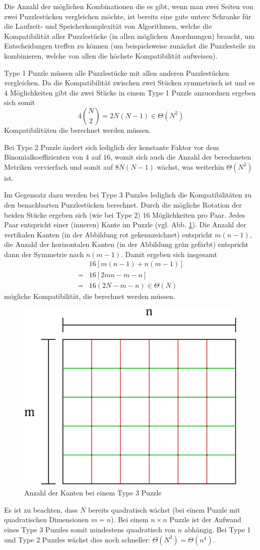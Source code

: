 \documentclass{whswinvcbook}
\begin{document}
Die Anzahl der möglichen Kombinationen die es gibt, wenn man zwei Seiten von zwei Puzzlestücken vergleichen möchte, ist bereits eine gute untere Schranke für die Laufzeit- und Speicherkomplexität von Algorithmen, welche die Kompatibilität aller Puzzlestücke (in allen möglichen Anordnungen) braucht, um Entscheidungen treffen zu können (um beispielsweise zunächst die Puzzlesteile zu kombinieren, welche von allen die höchste Kompatibilität aufweisen).

Type 1 Puzzle müssen alle Puzzlestücke mit allen anderen Puzzlestücken vergleichen. Da die Kompatibilität zwischen zwei Stücken symmetrisch ist und es $4$ Möglichkeiten gibt die zwei Stücke in einem Type 1 Puzzle anzuordnen ergeben sich somit $$4\binom{N}{2}=2N(N-1)\in\Theta(N^2)$$ Kompatibilitäten die berechnet werden müssen.

Bei Type 2 Puzzle ändert sich lediglich der konstante Faktor vor dem Binomialkoeffizienten von $4$ auf $16$, womit sich auch die Anzahl der berechneten Metriken vervierfach und somit auf $8N(N-1)$ wächst, was weiterhin $\Theta(N^2)$ ist.

Im Gegensatz dazu werden bei Type 3 Puzzles lediglich die Kompatibilitäten zu den benachbarten Puzzlestücken berechnet. Durch die mögliche Rotation der beiden Stücke ergeben sich (wie bei Type 2) $16$ Möglichkeiten pro Paar. Jedes Paar entspricht einer (inneren) Kante im Puzzle (vgl. Abb. \ref{fig-type3}). Die Anzahl der vertikalen Kanten (in der Abbildung rot gekennzeichnet) entspricht $m(n-1)$, die Anzahl der horizontalen Kanten (in der Abbildung grün gefärbt) entspricht dann der Symmetrie nach $n(m-1)$. Damit ergeben sich insgesamt
\begin{align*}
    &16[m(n-1)+n(m-1)]\\
    =&16[2mn-m-n]\\
    =&16(2N-m-n)\in\Theta(N)
\end{align*}
mögliche Kompatibilität, die berechnet werden müssen.
\begin{figure}[H]
    \centering
    \includegraphics[width=0.60\linewidth]{img/type3.png}
    \caption{Anzahl der Kanten bei einem Type 3 Puzzle}
    \label{fig-type3}
\end{figure}
Es ist zu beachten, dass $N$ bereits quadratisch wächst (bei einem Puzzle mit quadratischen Dimensionen $m=n$). Bei einem $n\times n$ Puzzle ist der Aufwand eines Type 3 Puzzles somit mindestens quadratisch von $n$ abhängig. Bei Type 1 und Type 2 Puzzles wächst dies noch schneller: $\Theta(N^2)=\Theta(n^4)$.
\end{document}
